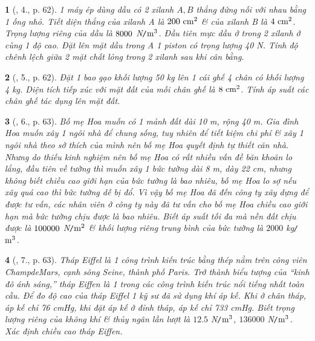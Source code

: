 \documentclass{article}
\newtheorem{baitoan}{}
\begin{document}
\begin{baitoan}[\cite{Van_Quyen_Hanh_Nhu_10_chuyen_Ly}, 4., p. 62]
	1 máy ép dùng dầu có 2 xilanh $A,B$ thẳng đứng nối với nhau bằng 1 ống nhỏ. Tiết diện thẳng của xilanh A là $\rm200\ cm^2$ \& của xilanh B là $\rm4\ cm^2$. Trọng lượng riêng của dầu là $\rm8000$ {\rm N{\tt/}$\rm m^3$}. Đầu tiên mực dầu ở trong 2 xilanh ở cùng 1 độ cao. Đặt lên mặt dầu trong A 1 piston có trọng lượng {\rm40 N}. Tính độ chênh lệch giữa 2 mặt chất lỏng trong 2 xilanh sau khi cân bằng.
\end{baitoan}

\begin{baitoan}[\cite{Van_Quyen_Hanh_Nhu_10_chuyen_Ly}, 5., p. 62]
	Đặt 1 bao gạo khối lượng {\rm50 kg} lên 1 cái ghế 4 chân có khối lượng {\rm4 kg}. Diện tích tiếp xúc với mặt đất của mỗi chân ghế là $\rm8\ cm^2$. Tính áp suất các chân ghế tác dụng lên mặt đất.
\end{baitoan}

\begin{baitoan}[\cite{Van_Quyen_Hanh_Nhu_10_chuyen_Ly}, 6., p. 63]
	Bố mẹ Hoa muốn có 1 mảnh đất dài {\rm10 m}, rộng {\rm40 m}. Gia đình Hoa muốn xây 1 ngôi nhà để chung sống, tuy nhiên để tiết kiệm chi phí \& xây 1 ngôi nhà theo sở thích của mình nên bố mẹ Hoa quyết định tự thiết căn nhà. Nhưng do thiếu kinh nghiệm nên bố mẹ Hoa có rất nhiều vấn đề băn khoăn lo lắng, đầu tiên về tường thì muốn xây 1 bức tường dài {\rm 8 m}, dày {\rm22 cm}, nhưng không biết chiều cao giới hạn của bức tường là bao nhiêu, bố mẹ Hoa lo sợ nếu xây quá cao thì bức tường dễ bị đổ. Vì vậy bố mẹ Hoa đã đến công ty xây dựng để được tư vấn, các nhân viên ở công ty này đã tư vấn cho bố mẹ Hoa chiều cao giới hạn mà bức tường chịu được là bao nhiêu. Biết áp suất tối đa mà nền đất chịu được là $\rm100000$ {\rm N{\tt/}$\rm m^2$} \& khối lượng riêng trung bình của bức tường là $2000$ {\rm kg{\tt/}$\rm m^3$}.
\end{baitoan}

\begin{baitoan}[\cite{Van_Quyen_Hanh_Nhu_10_chuyen_Ly}, 7., p. 63]
	Tháp Eiffel là 1 công trình kiến trúc bằng thép nằm trên công viên ChampdeMars, cạnh sông Seine, thành phố Paris. Trở thành biểu tượng của ``kinh đô ánh sáng,'' tháp Eiffen là 1 trong các công trình kiến trúc nổi tiếng nhất toàn cầu. Để đo độ cao của tháp Eiffel 1 kỹ sư đã sử dụng khí áp kế. Khi ở chân tháp, áp kế chỉ {\rm76 cmHg}, khi đặt áp kế ở đỉnh tháp, áp kế chỉ {\rm733 cmHg}. Biết trọng lượng riêng của không khí \& thủy ngân lần lượt là $12.5$ {\rm N{\tt/}$\rm m^3$}, $136000$ {\rm N{\tt/}$\rm m^3$}. Xác định chiều cao tháp Eiffen.
\end{baitoan}
\end{document}
